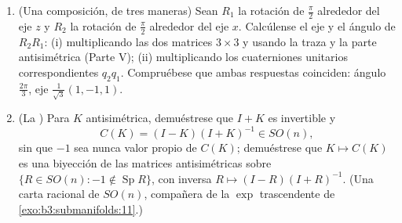 \begin{problem}
\begin{enumerate}[resume]
  \item (Una composición, de tres maneras) Sean $R_1$ la rotación de
  $\frac\pi2$ alrededor del eje $z$ y $R_2$ la rotación de $\frac\pi2$
  alrededor del eje $x$. Calcúlense el eje y el ángulo de $R_2R_1$: (i)
  multiplicando las dos matrices $3\times3$ y usando la traza y la parte
  antisimétrica (Parte V); (ii) multiplicando los cuaterniones unitarios
  correspondientes $q_2q_1$. Compruébese que ambas respuestas coinciden:
  ángulo $\frac{2\pi}3$, eje $\frac1{\sqrt3}(1, -1, 1)$. \item (La
  ) Para $K$
  antisimétrica, demuéstrese que $I + K$ es invertible y
        \[
        C(K) = (I - K)(I + K)^{-1} \in SO(n),
        \]
        sin que $-1$ sea nunca valor propio de $C(K)$; demuéstrese que
        $K \mapsto C(K)$ es una biyección de las matrices antisimétricas
        sobre $\{R \in SO(n) : -1 \notin
        \operatorname{Sp}R\}$, con inversa $R \mapsto (I -
        R)(I + R)^{-1}$. (Una carta racional de $SO(n)$, compañera de la
        $\exp$ trascendente de
        \cref{exo:b3:submanifolds:11}.)
\end{enumerate}
\end{problem}
